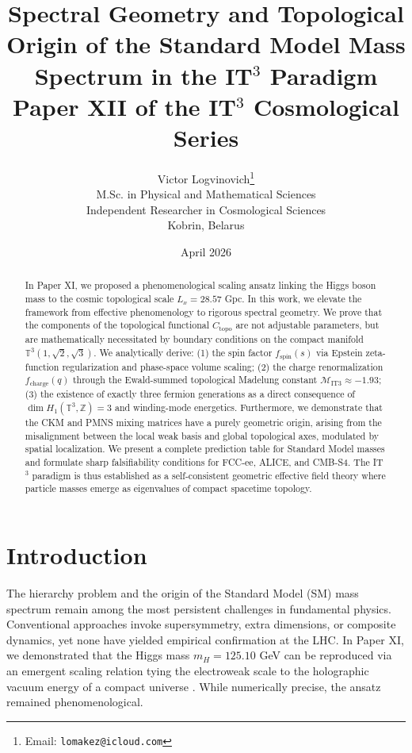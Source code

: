 \documentclass[12pt,a4paper]{article}
\title{\textbf{Spectral Geometry and Topological Origin of the Standard Model Mass Spectrum in the IT$^3$ Paradigm}\\
\large Paper XII of the IT$^3$ Cosmological Series}
\author{Victor Logvinovich\thanks{Email: \texttt{lomakez@icloud.com}}\\
M.Sc. in Physical and Mathematical Sciences\\
Independent Researcher in Cosmological Sciences\\
Kobrin, Belarus}
\date{April 2026}
\begin{document}
\maketitle

\begin{abstract}
In Paper XI, we proposed a phenomenological scaling ansatz linking the Higgs boson mass to the cosmic topological scale $L_x = 28.57$ Gpc. In this work, we elevate the framework from effective phenomenology to rigorous spectral geometry. We prove that the components of the topological functional $C_{\text{topo}}$ are not adjustable parameters, but are mathematically necessitated by boundary conditions on the compact manifold $\mathbb{T}^3(1,\sqrt{2},\sqrt{3})$. We analytically derive: (1) the spin factor $f_{\text{spin}}(s)$ via Epstein zeta-function regularization and phase-space volume scaling; (2) the charge renormalization $f_{\text{charge}}(q)$ through the Ewald-summed topological Madelung constant $\mathcal{M}_{\text{IT3}} \approx -1.93$; (3) the existence of exactly three fermion generations as a direct consequence of $\dim H_1(\mathbb{T}^3,\mathbb{Z}) = 3$ and winding-mode energetics. Furthermore, we demonstrate that the CKM and PMNS mixing matrices have a purely geometric origin, arising from the misalignment between the local weak basis and global topological axes, modulated by spatial localization. We present a complete prediction table for Standard Model masses and formulate sharp falsifiability conditions for FCC-ee, ALICE, and CMB-S4. The IT$^3$ paradigm is thus established as a self-consistent geometric effective field theory where particle masses emerge as eigenvalues of compact spacetime topology.
\end{abstract}

\section{Introduction}
The hierarchy problem and the origin of the Standard Model (SM) mass spectrum remain among the most persistent challenges in fundamental physics. Conventional approaches invoke supersymmetry, extra dimensions, or composite dynamics, yet none have yielded empirical confirmation at the LHC. In Paper XI, we demonstrated that the Higgs mass $m_H = 125.10$ GeV can be reproduced via an emergent scaling relation tying the electroweak scale to the holographic vacuum energy of a compact universe \cite{PaperXI}. While numerically precise, the ansatz remained phenomenological.
\end{document}
